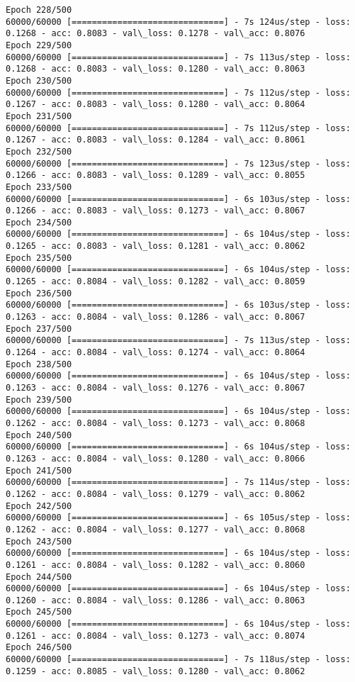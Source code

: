 \documentclass[11pt]{article}
\begin{document}
\begin{Verbatim}[commandchars=\\\{\}]
Epoch 228/500
60000/60000 [==============================] - 7s 124us/step - loss: 0.1268 - acc: 0.8083 - val\_loss: 0.1278 - val\_acc: 0.8076
Epoch 229/500
60000/60000 [==============================] - 7s 113us/step - loss: 0.1268 - acc: 0.8083 - val\_loss: 0.1280 - val\_acc: 0.8063
Epoch 230/500
60000/60000 [==============================] - 7s 112us/step - loss: 0.1267 - acc: 0.8083 - val\_loss: 0.1280 - val\_acc: 0.8064
Epoch 231/500
60000/60000 [==============================] - 7s 112us/step - loss: 0.1267 - acc: 0.8083 - val\_loss: 0.1284 - val\_acc: 0.8061
Epoch 232/500
60000/60000 [==============================] - 7s 123us/step - loss: 0.1266 - acc: 0.8083 - val\_loss: 0.1289 - val\_acc: 0.8055
Epoch 233/500
60000/60000 [==============================] - 6s 103us/step - loss: 0.1266 - acc: 0.8083 - val\_loss: 0.1273 - val\_acc: 0.8067
Epoch 234/500
60000/60000 [==============================] - 6s 104us/step - loss: 0.1265 - acc: 0.8083 - val\_loss: 0.1281 - val\_acc: 0.8062
Epoch 235/500
60000/60000 [==============================] - 6s 104us/step - loss: 0.1265 - acc: 0.8084 - val\_loss: 0.1282 - val\_acc: 0.8059
Epoch 236/500
60000/60000 [==============================] - 6s 103us/step - loss: 0.1263 - acc: 0.8084 - val\_loss: 0.1286 - val\_acc: 0.8067
Epoch 237/500
60000/60000 [==============================] - 7s 113us/step - loss: 0.1264 - acc: 0.8084 - val\_loss: 0.1274 - val\_acc: 0.8064
Epoch 238/500
60000/60000 [==============================] - 6s 104us/step - loss: 0.1263 - acc: 0.8084 - val\_loss: 0.1276 - val\_acc: 0.8067
Epoch 239/500
60000/60000 [==============================] - 6s 104us/step - loss: 0.1262 - acc: 0.8084 - val\_loss: 0.1273 - val\_acc: 0.8068
Epoch 240/500
60000/60000 [==============================] - 6s 104us/step - loss: 0.1263 - acc: 0.8084 - val\_loss: 0.1280 - val\_acc: 0.8066
Epoch 241/500
60000/60000 [==============================] - 7s 114us/step - loss: 0.1262 - acc: 0.8084 - val\_loss: 0.1279 - val\_acc: 0.8062
Epoch 242/500
60000/60000 [==============================] - 6s 105us/step - loss: 0.1262 - acc: 0.8084 - val\_loss: 0.1277 - val\_acc: 0.8068
Epoch 243/500
60000/60000 [==============================] - 6s 104us/step - loss: 0.1261 - acc: 0.8084 - val\_loss: 0.1282 - val\_acc: 0.8060
Epoch 244/500
60000/60000 [==============================] - 6s 104us/step - loss: 0.1260 - acc: 0.8084 - val\_loss: 0.1286 - val\_acc: 0.8063
Epoch 245/500
60000/60000 [==============================] - 6s 104us/step - loss: 0.1261 - acc: 0.8084 - val\_loss: 0.1273 - val\_acc: 0.8074
Epoch 246/500
60000/60000 [==============================] - 7s 118us/step - loss: 0.1259 - acc: 0.8085 - val\_loss: 0.1280 - val\_acc: 0.8062

\end{Verbatim}
\end{document}
